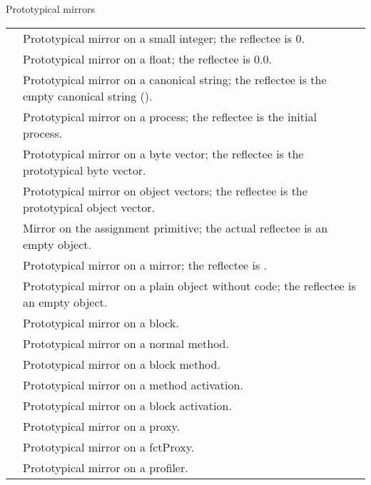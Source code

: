 \documentclass[letterpaper,10pt,english]{sphinxmanual}
\begin{document}
\begin{threeparttable}
\capstart\caption{Prototypical mirrors}\label{\detokenize{vmref:id10}}
\noindent\begin{tabulary}{\linewidth}{p{5cm} p{10cm}}
\hline
{}\relax &\relax \\
\hline
{}
&
Prototypical mirror on a small integer; the reflectee is 0.
\\
\hline
{}
&
Prototypical mirror on a float; the reflectee is 0.0.
\\
\hline
{}
&
Prototypical mirror on a canonical string; the reflectee is the empty canonical string ().
\\
\hline
{}
&
Prototypical mirror on a process; the reflectee is the initial process.
\\
\hline
{}
&
Prototypical mirror on a byte vector; the reflectee is the prototypical byte vector.
\\
\hline
{}
&
Prototypical mirror on object vectors; the reflectee is the prototypical object vector.
\\
\hline
{}
&
Mirror on the assignment primitive; the actual reflectee is an empty object.
\\
\hline
{}
&
Prototypical mirror on a mirror; the reflectee is .
\\
\hline
{}
&
Prototypical mirror on a plain object without code; the reflectee is an empty object.
\\
\hline
{}
&
Prototypical mirror on a block.
\\
\hline
{}
&
Prototypical mirror on a normal method.
\\
\hline
{}
&
Prototypical mirror on a block method.
\\
\hline
{}
&
Prototypical mirror on a method activation.
\\
\hline
{}
&
Prototypical mirror on a block activation.
\\
\hline
{}
&
Prototypical mirror on a proxy.
\\
\hline
{}
&
Prototypical mirror on a fctProxy.
\\
\hline
{}
&
Prototypical mirror on a profiler.
\\
\hline\end{tabulary}

\end{threeparttable}
\end{document}
